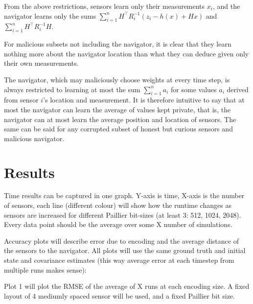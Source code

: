 \documentclass[twocolumn]{autart}
\begin{document}
From the above restrictions, sensors learn only their measurements $x_i$, and the navigator learns only the sums $\sum^n_{i=1}H^\top R^{-1}_i(z_i - h(x) + Hx)$ and $\sum^n_{i=1}H^\top R_i^{-1}H$.

For malicious subsets not including the navigator, it is clear that they learn nothing more about the navigator location than what they can deduce given only their own measurements.

The navigator, which may maliciously choose weights at every time step, is always restricted to learning at most the sum $\sum^n_{i=1} a_i$ for some values $a_i$ derived from sensor $i$'s location and measurement. It is therefore intuitive to say that at most the navigator can learn the average of values kept private, that is, the navigator can at most learn the average position and location of sensors. The same can be said for any corrupted subset of honest but curious sensors and malicious navigator.


% 
%                                                          
%                                                          
%                                                          
% 

\section{Results} \label{sec:results}
Time results can be captured in one graph. Y-axis is time, X-axis is the number of sensors, each line (different colour) will show how the runtime changes as sensors are increased for different Paillier bit-sizes (at least 3: 512, 1024, 2048). Every data point should be the average over some X number of simulations.

Accuracy plots will describe error due to encoding and the average distance of the sensors to the navigator. All plots will use the same ground truth and initial state and covariance estimates (this way average error at each timestep from multiple runs makes sense):

Plot 1 will plot the RMSE of the average of X runs at each encoding size. A fixed layout of 4 mediumly spaced sensor will be used, and a fixed Paillier bit size.
\end{document}
